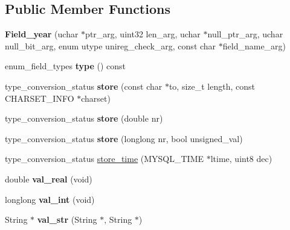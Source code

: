 \subsection*{Public Member Functions}
\begin{DoxyCompactItemize}
\item 
\mbox{\label{classField__year_af519f3e5af1bd0957a680403d70ecb7d}} 
{\bfseries Field\+\_\+year} (uchar $\ast$ptr\+\_\+arg, uint32 len\+\_\+arg, uchar $\ast$null\+\_\+ptr\+\_\+arg, uchar null\+\_\+bit\+\_\+arg, enum utype unireg\+\_\+check\+\_\+arg, const char $\ast$field\+\_\+name\+\_\+arg)
\item 
\mbox{\label{classField__year_a414039954821fec15f72d884f3dda583}} 
enum\+\_\+field\+\_\+types {\bfseries type} () const
\item 
\mbox{\label{classField__year_ab844be888cbfdd03f6eb24ee68a73f2b}} 
type\+\_\+conversion\+\_\+status {\bfseries store} (const char $\ast$to, size\+\_\+t length, const C\+H\+A\+R\+S\+E\+T\+\_\+\+I\+N\+FO $\ast$charset)
\item 
\mbox{\label{classField__year_a04f757dccd78017dd6f772c890abbc32}} 
type\+\_\+conversion\+\_\+status {\bfseries store} (double nr)
\item 
\mbox{\label{classField__year_a8bc69c499ab99a67623efb5d7bbad5be}} 
type\+\_\+conversion\+\_\+status {\bfseries store} (longlong nr, bool unsigned\+\_\+val)
\item 
type\+\_\+conversion\+\_\+status \mbox{\hyperlink{classField__year_a20cfacc8efbe8c12137deea34c287be0}{store\+\_\+time}} (M\+Y\+S\+Q\+L\+\_\+\+T\+I\+ME $\ast$ltime, uint8 dec)
\item 
\mbox{\label{classField__year_afff13e1781bf1356e430bca22061704f}} 
double {\bfseries val\+\_\+real} (void)
\item 
\mbox{\label{classField__year_ab7f86130a46ba8650984025174fb3f7b}} 
longlong {\bfseries val\+\_\+int} (void)
\item 
\mbox{\label{classField__year_a8fa4c1c88773768457d8a0ab6f3703b3}} 
String $\ast$ {\bfseries val\+\_\+str} (String $\ast$, String $\ast$)

\end{DoxyCompactItemize}
